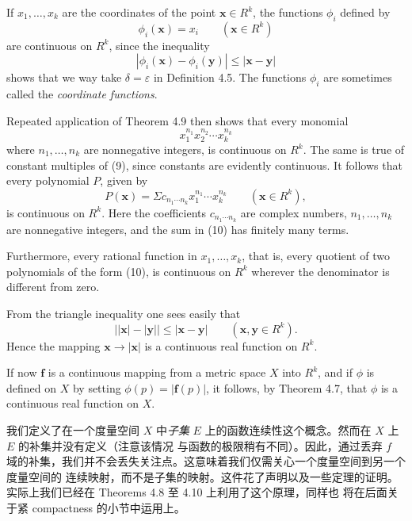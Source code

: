 \documentclass[../poma-notes.tex]{subfiles}
\begin{document}
\begin{examples}
  If $x_1, \dots, x_k$ are the coordinates of the point $\mathbf{x} \in R^k$, the functions $\phi_i$ defined by
  \begin{equation}
    \phi_i(\mathbf{x}) = x_i \qquad (\mathbf{x} \in R^k)
  \end{equation}
  are continuous on $R^k$, since the inequality
  \[
    |\phi_i(\mathbf{x}) - \phi_i(\mathbf{y})| \le |\mathbf{x} - \mathbf{y}|
  \]
  shows that we way take $\delta = \varepsilon$ in Definition 4.5. The functions $\phi_i$ are sometimes called
  the \textit{coordinate functions}.

  Repeated application of Theorem 4.9 then shows that every monomial
  \begin{equation}
    x_1^{n_1} x_2^{n_2} \cdots x_k^{n_k}
  \end{equation}
  where $n_1, \dots, n_k$ are nonnegative integers, is continuous on $R^k$. The same is true of constant multiples
  of (9), since constants are evidently continuous. It follows that every polynomial $P$, given by
  \begin{equation}
    P(\mathbf{x}) = \Sigma c_{n_1 \cdots n_k} x_1^{n_1} \cdots x_k^{n_k} \qquad (\mathbf{x} \in R^k),
  \end{equation}
  is continuous on $R^k$. Here the coefficients $c_{n_1 \cdots n_k}$ are complex numbers, $n_1, \dots, n_k$ are
  nonnegative integers, and the sum in (10) has finitely many terms.

  Furthermore, every rational function in $x_1, \dots, x_k$, that is, every quotient of two polynomials of the
  form (10), is continuous on $R^k$ wherever the denominator is different from zero.

  From the triangle inequality one sees easily that
  \begin{equation}
    \bigl||\mathbf{x}| - |\mathbf{y}|\bigr| \le |\mathbf{x} - \mathbf{y}|\qquad (\mathbf{x}, \mathbf{y} \in R^k).
  \end{equation}
  Hence the mapping $\mathbf{x} \to |\mathbf{x}|$ is a continuous real function on $R^k$.

  If now $\mathbf{f}$ is a continuous mapping from a metric space $X$ into $R^k$, and if $\phi$ is defined on
  $X$ by setting $\phi(p) = |\mathbf{f}(p)|$, it follows, by Theorem 4.7, that $\phi$ is a continuous real
  function on $X$.
\end{examples}

\begin{remark}
  我们定义了在一个度量空间 $X$ 中\textit{子集} $E$ 上的函数连续性这个概念。然而在 $X$ 上 $E$ 的补集并没有定义（注意该情况
  与函数的极限稍有不同）。因此，通过丢弃 $f$ 域的补集，我们并不会丢失关注点。这意味着我们仅需关心一个度量空间到另一个度量空间的
  连续映射，而不是子集的映射。这件花了声明以及一些定理的证明。实际上我们已经在 Theorems 4.8 至 4.10 上利用了这个原理，同样也
  将在后面关于紧 compactness 的小节中运用上。
\end{remark}
\end{document}
